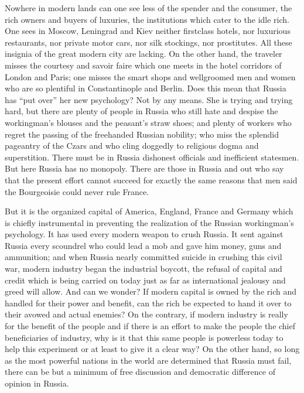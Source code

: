 \documentclass[letterpaper,10pt,english]{jupyterBook}
\begin{document}
\sphinxAtStartPar
Nowhere in modern lands can one see less of the spender and the consumer, the rich owners and buyers of luxuries, the institutions which cater to the idle rich. One sees in Moscow, Leningrad and Kiev neither first\sphinxhyphen{}class hotels, nor luxurious restaurants, nor private motor cars, nor silk stockings, nor prostitutes. All these insignia of the great modern city are lacking. On the other hand, the traveler misses the courtesy and savoir faire which one meets in the hotel corridors of London and Paris; one misses the smart shops and well\sphinxhyphen{}groomed men and women who are so plentiful in Constantinople and Berlin. Does this mean that Russia has “put over” her new psychology? Not by any means. She is trying and trying hard, but there are plenty of people in Russia who still hate and despise the workingman’s blouses and the peasant’s straw shoes; and plenty of workers who regret the passing of the free\sphinxhyphen{}handed Russian nobility; who miss the splendid pageantry of the Czars and who cling doggedly to religious dogma and superstition. There must be in Russia dishonest officials and inefficient statesmen. But here Russia has no monopoly. There are those in Russia and out who say that the present effort cannot succeed for exactly the same reasons that men said the Bourgeoisie could never rule France.

\sphinxAtStartPar
But it is the organized capital of America, England, France and Germany which is chiefly instrumental in preventing the realization of the Russian workingman’s psychology. It has used every modern weapon to crush Russia. It sent against Russia every scoundrel who could lead a mob and gave him money, guns and ammunition; and when Russia nearly committed suicide in crushing this civil war, modern industry began the industrial boycott, the refusal of capital and credit which is being carried on today just as far as international jealousy and greed will allow. And can we wonder? If modern capital is owned by the rich and handled for their power and benefit, can the rich be expected to hand it over to their avowed and actual enemies? On the contrary, if modern industry is really for the benefit of the people and if there is an effort to make the people the chief beneficiaries of industry, why is it that this same people is powerless today to help this experiment or at least to give it a clear way? On the other hand, so long as the most powerful nations in the world are determined that Russia must fail, there can be but a minimum of free discussion and democratic difference of opinion in Russia.
\end{document}
